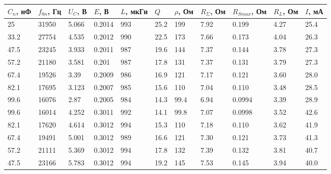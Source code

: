 \documentclass[a4paper]{article}
\begin{document}
\begin{table}[tb]
	\centering
	\begin{tabular}{|l|l|l|l|l|l|l|l|l|l|l|}
		\hline
		$C_n$, нФ  & $f_{0 n}$, Гц  & $U_C$, В  & $E$, В  & $L$, мкГн & $Q$  & $\rho$, Ом & $R_\Sigma$, Ом & $R_{S max}$, Ом & $R_L$, Ом & $I$, мА \\ \hline
		25         & 31950          & 5.066     & 0.2014  & 993       & 25.2 & 199        & 7.92           & 0.199           & 4.27      & 25.4    \\ \hline
		33.2       & 27754          & 4.535     & 0.2012  & 990       & 22.5 & 173        & 7.66           & 0.173           & 4.04      & 26.3    \\ \hline
		47.5       & 23245          & 3.933     & 0.2011  & 987       & 19.6 & 144        & 7.37           & 0.144           & 3.78      & 27.3    \\ \hline
		57.2       & 21180          & 3.581     & 0.201   & 987       & 17.8 & 131        & 7.37           & 0.131           & 3.79      & 27.3    \\ \hline
		67.4       & 19526          & 3.39      & 0.2009  & 986       & 16.9 & 121        & 7.17           & 0.121           & 3.60      & 28.0    \\ \hline
		82.1       & 17695          & 3.123     & 0.2007  & 985       & 15.6 & 110        & 7.04           & 0.110           & 3.48      & 28.5    \\ \hline
		99.6       & 16076          & 2.87      & 0.2005  & 984       & 14.3 & 99.4       & 6.94           & 0.0994          & 3.39      & 28.9    \\ \hline
		99.6       & 16014          & 4.252     & 0.3011  & 992       & 14.1 & 99.8       & 7.07           & 0.0998          & 3.52      & 42.6    \\ \hline
		82.1       & 17620          & 4.614     & 0.3012  & 994       & 15.3 & 110        & 7.18           & 0.110           & 3.62      & 41.9    \\ \hline
		67.4       & 19491          & 5.001     & 0.3012  & 989       & 16.6 & 121        & 7.30           & 0.121           & 3.73      & 41.3    \\ \hline
		57.2       & 21111          & 5.369     & 0.3012  & 994       & 17.8 & 132        & 7.39           & 0.132           & 3.81      & 40.7    \\ \hline
		47.5       & 23166          & 5.783     & 0.3012  & 994       & 19.2 & 145        & 7.53           & 0.145           & 3.94      & 40.0    \\ \hline

\end{tabular}
\end{table}
\end{document}

